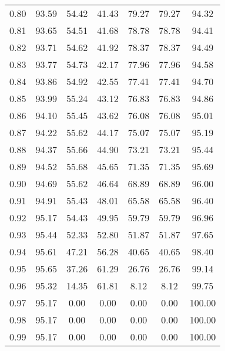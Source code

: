 \begin{tabular}{|c|c|c|c|c|c|c|}
      0.80 &     93.59 &     54.42 &      41.43 &   79.27 &      79.27 &         94.32 \\
      0.81 &     93.65 &     54.51 &      41.68 &   78.78 &      78.78 &         94.41 \\
      0.82 &     93.71 &     54.62 &      41.92 &   78.37 &      78.37 &         94.49 \\
      0.83 &     93.77 &     54.73 &      42.17 &   77.96 &      77.96 &         94.58 \\
      0.84 &     93.86 &     54.92 &      42.55 &   77.41 &      77.41 &         94.70 \\
      0.85 &     93.99 &     55.24 &      43.12 &   76.83 &      76.83 &         94.86 \\
      0.86 &     94.10 &     55.45 &      43.62 &   76.08 &      76.08 &         95.01 \\
      0.87 &     94.22 &     55.62 &      44.17 &   75.07 &      75.07 &         95.19 \\
      0.88 &     94.37 &     55.66 &      44.90 &   73.21 &      73.21 &         95.44 \\
      0.89 &     94.52 &     55.68 &      45.65 &   71.35 &      71.35 &         95.69 \\
      0.90 &     94.69 &     55.62 &      46.64 &   68.89 &      68.89 &         96.00 \\
      0.91 &     94.91 &     55.43 &      48.01 &   65.58 &      65.58 &         96.40 \\
      0.92 &     95.17 &     54.43 &      49.95 &   59.79 &      59.79 &         96.96 \\
      0.93 &     95.44 &     52.33 &      52.80 &   51.87 &      51.87 &         97.65 \\
      0.94 &     95.61 &     47.21 &      56.28 &   40.65 &      40.65 &         98.40 \\
      0.95 &     95.65 &     37.26 &      61.29 &   26.76 &      26.76 &         99.14 \\
      0.96 &     95.32 &     14.35 &      61.81 &    8.12 &       8.12 &         99.75 \\
      0.97 &     95.17 &      0.00 &       0.00 &    0.00 &       0.00 &        100.00 \\
      0.98 &     95.17 &      0.00 &       0.00 &    0.00 &       0.00 &        100.00 \\
      0.99 &     95.17 &      0.00 &       0.00 &    0.00 &       0.00 &        100.00 \\
\bottomrule
\end{tabular}
